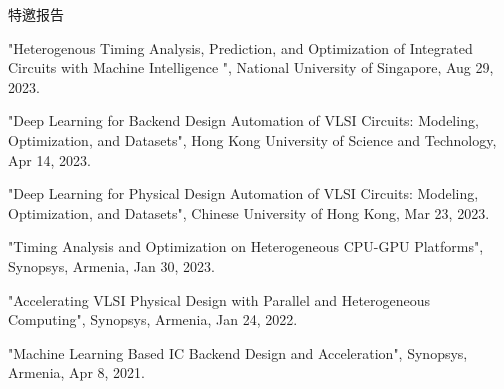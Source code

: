 \begin{rSection}{特邀报告}
\begin{description}[font=\normalfont]
\item[{[T6]}]{
    "Heterogenous Timing Analysis, Prediction, and Optimization of Integrated Circuits with Machine Intelligence ", National University of Singapore, Aug 29, 2023. 
}

\item[{[T5]}]{
    "Deep Learning for Backend Design Automation of VLSI Circuits: Modeling, Optimization, and Datasets", Hong Kong University of Science and Technology, Apr 14, 2023. 
}

\item[{[T4]}]{
    "Deep Learning for Physical Design Automation of VLSI Circuits: Modeling, Optimization, and Datasets", Chinese University of Hong Kong, Mar 23, 2023. 
}

\item[{[T3]}]{
    "Timing Analysis and Optimization on Heterogeneous CPU-GPU Platforms", Synopsys, Armenia, Jan 30, 2023. 
}

\item[{[T2]}]{
    "Accelerating VLSI Physical Design with Parallel and Heterogeneous Computing", Synopsys, Armenia, Jan 24, 2022. 
}

\item[{[T1]}]{
    "Machine Learning Based IC Backend Design and Acceleration", Synopsys, Armenia, Apr 8, 2021. 
}

\end{description}

\end{rSection}
